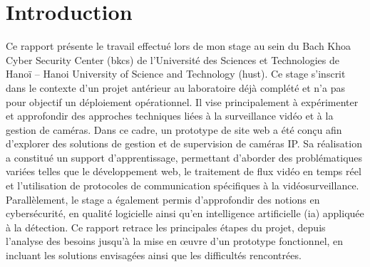 



\renewcommand{\tablename}{Tab.}
\renewcommand{\figurename}{Fig.}



\newpage
\myemptypage


\newpage
\hypersetup{pageanchor=true}
\setcounter{page}{1}
\tableofcontents
\listoffigures
\printglossaries







\newpage


\newpage
\chapter*{Introduction}

Ce rapport présente le travail effectué lors de mon stage au sein du Bach Khoa Cyber Security Center (\acrshort{bkcs}) de l’Université des Sciences et Technologies de Hanoï – Hanoi University of Science and Technology (\acrshort{hust}). 
Ce stage s'inscrit dans le contexte d'un projet antérieur au laboratoire déjà complété et n'a pas pour objectif un déploiement opérationnel. Il vise principalement à expérimenter et approfondir des approches techniques liées à la surveillance vidéo et à la gestion de caméras.
Dans ce cadre, un prototype de site web a été conçu afin d’explorer des solutions de gestion et de supervision de caméras IP. Sa réalisation a constitué un support d’apprentissage, permettant d’aborder des problématiques variées telles que le développement web, le traitement de flux vidéo en temps réel et l’utilisation de protocoles de communication spécifiques à la vidéosurveillance.
Parallèlement, le stage a également permis d’approfondir des notions en cybersécurité, en qualité logicielle ainsi qu’en intelligence artificielle (\acrshort{ia}) appliquée à la détection. Ce rapport retrace les principales étapes du projet, depuis l’analyse des besoins jusqu’à la mise en œuvre d’un prototype fonctionnel, en incluant les solutions envisagées ainsi que les difficultés rencontrées.





